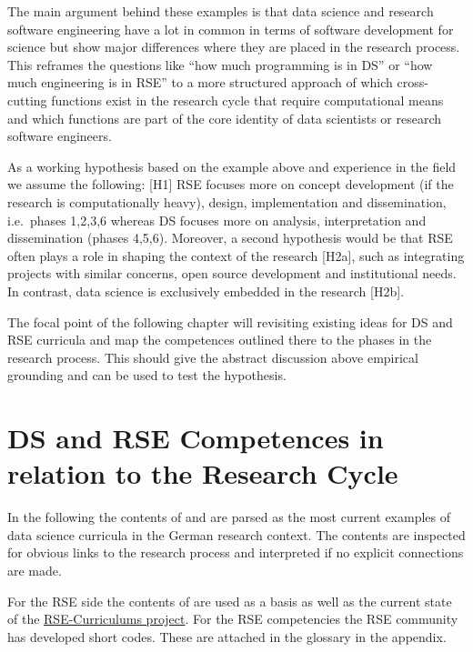 \documentclass[
        english,biblatex
    ]{lni}
\begin{document}
    The main argument behind these examples is that data science and
    research software engineering have a lot in common in terms of
    software development for science but show major differences where
    they are placed in the research process. This reframes the questions
    like ``how much programming is in DS'' or ``how much engineering is
    in RSE'' to a more structured approach of which cross-cutting
    functions exist in the research cycle that require computational
    means and which functions are part of the core identity of data
    scientists or research software engineers.

    As a working hypothesis based on the example above and experience in
    the field we assume the following: {[}H1{]} RSE focuses more on
    concept development (if the research is computationally heavy),
    design, implementation and dissemination, i.e.~phases 1,2,3,6
    whereas DS focuses more on analysis, interpretation and
    dissemination (phases 4,5,6). Moreover, a second hypothesis would be
    that RSE often plays a role in shaping the context of the research
    {[}H2a{]}, such as integrating projects with similar concerns, open
    source development and institutional needs. In contrast, data
    science is exclusively embedded in the research {[}H2b{]}.

    The focal point of the following chapter will revisiting existing
    ideas for DS and RSE curricula and map the competences outlined
    there to the phases in the research process. This should give the
    abstract discussion above empirical grounding and can be used to
    test the hypothesis.

    \section{DS and RSE Competences in relation to the Research
    Cycle}\label{ds-and-rse-competences-in-relation-to-the-research-cycle}

    In the following the contents of \autocite{GI2021DataScience} and
    \autocite{petersen_2025_15025246} are parsed as the most current
    examples of data science curricula in the German research context.
    The contents are inspected for obvious links to the research process
    and interpreted if no explicit connections are made.

    For the RSE side the contents of \autocite{Goth2024RSE} are used as
    a basis as well as the current state of the
    \href{https://github.com/juliandehne/RSE-Masters/blob/main/curriculum.md}{RSE-Curriculums
    project}. For the RSE competencies the RSE community has developed
    short codes. These are attached in the glossary in the appendix.
\end{document}
